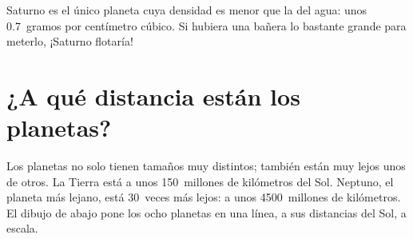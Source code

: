 \begin{remark}\label{rem:g6:earth-a-planet:saturn}
Saturno es el único planeta cuya densidad es menor que la del agua: unos
0.7~gramos por centímetro cúbico. Si hubiera una bañera lo bastante grande
para meterlo, ¡Saturno flotaría!
\end{remark}

\section{¿A qué distancia están los planetas?}

Los planetas no solo tienen tamaños muy distintos; también están muy
lejos unos de otros. La Tierra está a unos 150~millones de kilómetros del
Sol. Neptuno, el planeta más lejano, está 30~veces más lejos: a unos
4500~millones de kilómetros. El dibujo de abajo pone los ocho planetas en
una línea, a sus distancias del Sol, a escala.

